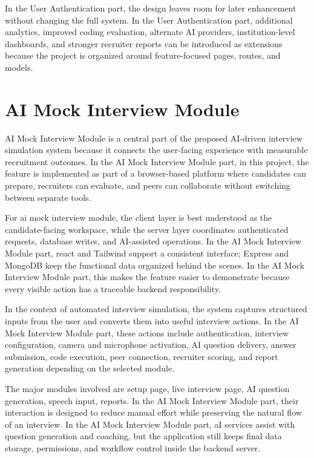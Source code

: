 \documentclass[12pt,a4paper]{report}
\begin{document}
In the User Authentication part, the design leaves room for later enhancement without changing the full system. In the User Authentication part, additional analytics, improved coding evaluation, alternate AI providers, institution-level dashboards, and stronger recruiter reports can be introduced as extensions because the project is organized around feature-focused pages, routes, and models.


\section{AI Mock Interview Module}

AI Mock Interview Module is a central part of the proposed AI-driven interview simulation system because it connects the user-facing experience with measurable recruitment outcomes. In the AI Mock Interview Module part, in this project, the feature is implemented as part of a browser-based platform where candidates can prepare, recruiters can evaluate, and peers can collaborate without switching between separate tools.


For ai mock interview module, the client layer is best understood as the candidate-facing workspace, while the server layer coordinates authenticated requests, database writes, and AI-assisted operations. In the AI Mock Interview Module part, react and Tailwind support a consistent interface; Express and MongoDB keep the functional data organized behind the scenes. In the AI Mock Interview Module part, this makes the feature easier to demonstrate because every visible action has a traceable backend responsibility.


In the context of automated interview simulation, the system captures structured inputs from the user and converts them into useful interview actions. In the AI Mock Interview Module part, these actions include authentication, interview configuration, camera and microphone activation, AI question delivery, answer submission, code execution, peer connection, recruiter scoring, and report generation depending on the selected module.


The major modules involved are setup page, live interview page, AI question generation, speech input, reports. In the AI Mock Interview Module part, their interaction is designed to reduce manual effort while preserving the natural flow of an interview. In the AI Mock Interview Module part, aI services assist with question generation and coaching, but the application still keeps final data storage, permissions, and workflow control inside the backend server.
\end{document}
